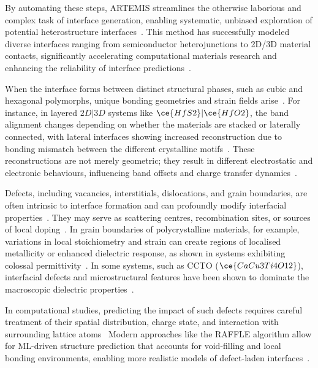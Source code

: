 By automating these steps, ARTEMIS streamlines the otherwise laborious and complex task of interface generation, enabling systematic, unbiased exploration of potential heterostructure interfaces~\nocite{}.
This method has successfully modeled diverse interfaces ranging from semiconductor heterojunctions to 2D/3D material contacts, significantly accelerating computational materials research and enhancing the reliability of interface predictions~\cite{artemis_paper,raffle_paper}.

\newpage \label{polymorph_interface_reconstruction} When the interface forms between distinct structural phases, such as cubic and hexagonal polymorphs, unique bonding geometries and strain fields arise~\cite{Chagarov2015-ol, Di_Liberto2022-gz}.
For instance, in layered $2D|3D$ systems like $\ce{HfS2}|\ce{HfO2}$, the band alignment changes depending on whether the materials are stacked or laterally connected, with lateral interfaces showing increased reconstruction due to bonding mismatch between the different crystalline motifs~\cite{Taylor2023-wh}.
These reconstructions are not merely geometric; they result in different electrostatic and electronic behaviours, influencing band offsets and charge transfer dynamics~\nocite{}.

\label{interfacial_defects} Defects, including vacancies, interstitials, dislocations, and grain boundaries, are often intrinsic to interface formation and can profoundly modify interfacial properties~\cite{Maji2021-kc}.
They may serve as scattering centres, recombination sites, or sources of local doping~\cite{Leitherer2023-ew}.
In grain boundaries of polycrystalline materials, for example, variations in local stoichiometry and strain can create regions of localised metallicity or enhanced dielectric response, as shown in systems exhibiting colossal permittivity~\nocite{}.%
In some systems, such as CCTO ($\ce{CaCu3Ti4O12}$), interfacial defects and microstructural features have been shown to dominate the macroscopic dielectric properties~\cite{raffle_paper}.

\label{defect_ml_prediction} In computational studies, predicting the impact of such defects requires careful treatment of their spatial distribution, charge state, and interaction with surrounding lattice atoms~\nocite{}
Modern approaches like the RAFFLE algorithm allow for ML-driven structure prediction that accounts for void-filling and local bonding environments, enabling more realistic models of defect-laden interfaces~\cite{raffle_paper}.

